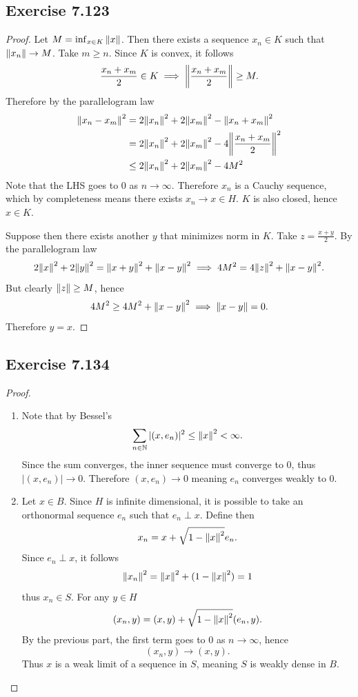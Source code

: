 \documentclass[hw_all.tex]{subfiles}
\begin{document}
\subsection{Exercise 7.123}
\begin{proof}
    Let $M = \inf_{x \in K} \norm{x}$. Then there exists a sequence $x_n \in K$ such that $\norm{x_n} \to M$. Take $m \geq n$. Since $K$ is convex, it follows
    \[
        \frac{x_n + x_m}{2} \in K \implies \norm{\frac{x_n + x_m}{2}} \geq M
    .\]
    Therefore by the parallelogram law
    \begin{align*}
        \norm{x_n - x_m}^2 &= 2 \norm{x_n}^2 + 2\norm{x_m}^2 - \norm{x_n + x_m}^2 \\
                           &= 2 \norm{x_n}^2 + 2\norm{x_m}^2 - 4 \norm{\frac{x_n + x_m}{2}}^2 \\
                           &\leq 2 \norm{x_n}^2 + 2 \norm{x_m}^2 - 4M^2
    \end{align*}
    Note that the LHS goes to $0$ as $n \to \infty$. Therefore $x_n$ is a Cauchy sequence, which by completeness means there exists $x_n \to x \in H$. $K$ is also closed, hence $x \in K$.

    Suppose then there exists another $y$ that minimizes norm in $K$. Take $z = \frac{x+y}{2}$. By the parallelogram law
    \[
        2 \norm{x}^2 + 2\norm{y}^2 = \norm{x + y}^2 + \norm{x - y}^2 \implies 4M^2 = 4 \norm{z}^2 + \norm{x - y}^2
    .\]
    But clearly $\norm{z} \geq M$, hence
    \[
        4M^2 \geq 4M^2 + \norm{x - y}^2 \implies \norm{x - y} = 0
    .\]
    Therefore $y = x$.
\end{proof}

\subsection{Exercise 7.134}
\begin{proof}
    \begin{enumerate}
        \item 
            Note that by Bessel's
            \[
                \sum_{n \in \mathbb{N}} |(x, e_n)|^2 \leq \norm{x}^2 < \infty
            .\]
            Since the sum converges, the inner sequence must converge to $0$, thus $|(x, e_n)| \to 0$. Therefore $(x, e_n) \to 0$ meaning $e_n$ converges weakly to $0$.

        \item 
            Let $x \in B$. Since $H$ is infinite dimensional, it is possible to take an orthonormal sequence $e_n$ such that $e_n \perp x$. Define then
            \[
                x_n = x + \sqrt{1 - \norm{x}^2} e_n
            .\]
            Since $e_n \perp x$, it follows
            \[
                \norm{x_n}^2 = \norm{x}^2 + (1 - \norm{x}^2) = 1
            \]
            thus $x_n \in S$. For any $y \in H$
            \[
                (x_n, y) = (x,y) + \sqrt{1 - \norm{x}^2} (e_n, y)
            .\]
            By the previous part, the first term goes to $0$ as $n \to \infty$, hence
            \[
                (x_n, y) \to (x, y)
            .\]
            Thus $x$ is a weak limit of a sequence in $S$, meaning $S$ is weakly dense in $B$.
    \end{enumerate}
\end{proof}
\end{document}

